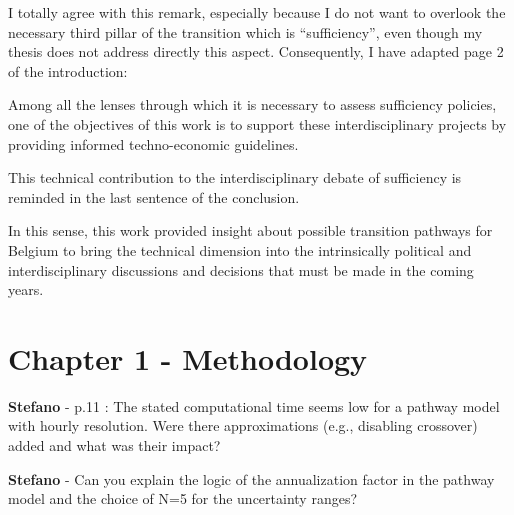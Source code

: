\documentclass[12pt,a4paper]{article}
\begin{document}
\noindent I totally agree with this remark, especially because I do not want to overlook the necessary third pillar of the transition which is ``sufficiency'', even though my thesis does not address directly this aspect. Consequently, I have adapted {\color{blue} page 2 of the introduction}:

\begin{mdframed}[style=manuscript] %
Among all the lenses through which it is necessary to assess sufficiency policies, one of the objectives of this work is to support these interdisciplinary projects by providing informed techno-economic guidelines.
\end{mdframed}

\noindent This technical contribution to the interdisciplinary debate of sufficiency is reminded in {\color{blue} the last sentence of the conclusion}.

\begin{mdframed}[style=manuscript] %
In this sense, this work provided insight about possible transition pathways for Belgium to bring the technical dimension into the intrinsically political and interdisciplinary discussions and decisions that must be made in the coming years.
\end{mdframed}

\section{Chapter 1 - Methodology}
\label{methodo}


\begin{mdframed}[style=comment] %
{\color{orange} \textbf{Stefano}} - p.11 : The stated computational time seems low for a pathway model with hourly resolution. Were there approximations (e.g., disabling crossover) added and what was their impact?\end{mdframed}

\noindent 

\begin{mdframed}[style=manuscript] %

\end{mdframed}

\begin{mdframed}[style=comment] %
{\color{orange} \textbf{Stefano}} - Can you explain the logic of the annualization factor in the pathway model and the choice of N=5 for the uncertainty ranges?
\end{mdframed}
\end{document}
